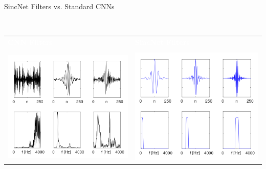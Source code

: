 \documentclass[notheorems, aspectratio=54]{beamer}
\begin{document}
\begin{frame}{SincNet Filters vs. Standard CNNs}
	\begin{block}{~\vspace{0.7cm}}
		\begin{center}
			\vspace{-0.8cm}
			\begin{tabular}{p{0.45\textwidth}|p{}}
				\textcolor{white}{\bf CNN Filters} & \textcolor{white}{\bf SincNet Filters} \\\\
				\includegraphics[width=1\linewidth]{images/cnn_filters.png} & \includegraphics[width=1\linewidth]{images/sincnet_filters.png}\\
			\end{tabular}
		\end{center}
	\end{block}
\end{frame}
\end{document}
